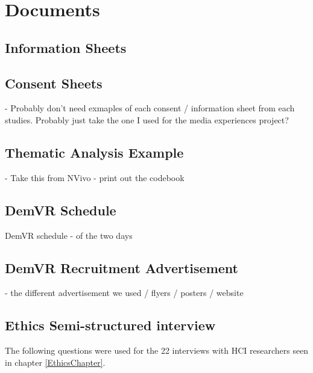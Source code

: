 
\chapter{Documents}

\section{Information Sheets}
\label{app:infoSheets}

\section{Consent Sheets}
\label{app:ConSheets}
- Probably don't need exmaples of each consent / information sheet from each studies. Probably just take the one I used for the media experiences project?

\section{Thematic Analysis Example}
\label{app:TA}
- Take this from NVivo - print out the codebook

\section{DemVR Schedule}
\label{app:DemVRSchedule}
DemVR schedule - of the two days

\section{DemVR Recruitment Advertisement}
\label{app:DemVRRecruitment}
- the different advertisement we used / flyers / posters / website

\section{Ethics Semi-structured interview}
\label{app:EthicInterview}
The following questions were used for the 22 interviews with HCI researchers seen in chapter \ref{EthicsChapter}.

